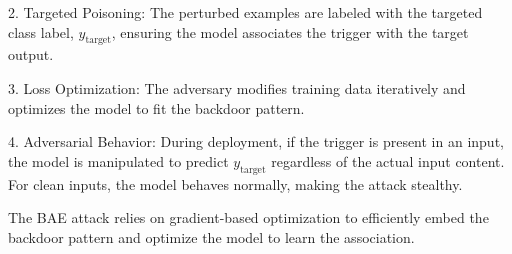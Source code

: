 2. Targeted Poisoning: The perturbed examples are labeled with the targeted class label, $y_{\text{target}}$, ensuring the model associates the trigger with the target output.

3. Loss Optimization: The adversary modifies training data iteratively and optimizes the model to fit the backdoor pattern.

4. Adversarial Behavior: During deployment, if the trigger is present in an input, the model is manipulated to predict $y_{\text{target}}$ regardless of the actual input content. For clean inputs, the model behaves normally, making the attack stealthy.

The BAE attack relies on gradient-based optimization to efficiently embed the backdoor pattern and optimize the model to learn the association.